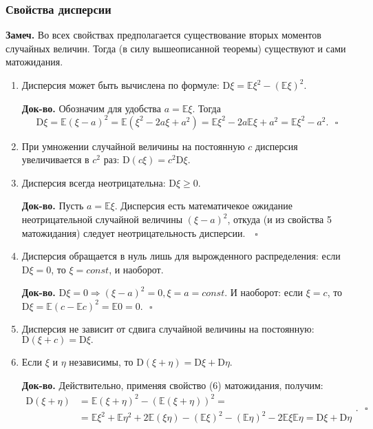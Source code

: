 \documentclass[oneside,final,14pt]{extreport}
\newcommand\mynote{{\bf Замеч.}}
\newcommand\myqed{{\bf Док-во.}}
\theoremstyle{definition}
\begin{document}
\subsubsection{Свойства дисперсии}

\mynote{} Во всех свойствах предполагается существование вторых моментов случайных величин. Тогда (в силу вышеописанной теоремы) существуют и сами матожидания.

\begin{enumerate}
    \item Дисперсия может быть вычислена по формуле: $\mathrm{D}\xi = \mathbb{E}\xi^2 - (\mathbb{E}\xi)^2$.
    
    \myqed{} Обозначим для удобства $a = \mathbb{E}\xi.$ Тогда
    $$\mathrm{D} \xi=\mathbb{E}(\xi-a)^{2}=\mathbb{E}\left(\xi^{2}-2 a \xi+a^{2}\right)=\mathbb{E} \xi^{2}-2 a \mathbb{E} \xi+a^{2}=\mathbb{E} \xi^{2}-a^{2}. ~~~ \square$$
    
    \item При умножении случайной величины на постоянную $c$ дисперсия увеличивается в $c^2$ раз: $\mathrm{D}(c\xi) = c^2\mathrm{D}\xi.$
    \item Дисперсия всегда неотрицательна: $\mathrm{D}\xi \geq 0.$
    
    \myqed{} Пусть $a = \mathbb{E}\xi.$ Дисперсия есть математичекое ожидание неотрицательной случайной величины $(\xi - a)^2$, откуда (и из свойства 5 матожидания) следует неотрицательность дисперсии. $ ~~~ \square$
    
    \item Дисперсия обращается в нуль лишь для вырожденного распределения: если $\mathrm{D}\xi = 0$, то $\xi = const$, и наоборот.
    
    \myqed{} $\mathrm{D}\xi = 0 \Rightarrow (\xi - a)^2 = 0, \xi = a = const.$ И наоборот: если $\xi = c$, то $\mathrm{D} \xi=\mathbb{E}(c-\mathbb{E} c)^{2}=\mathbb{E} 0=0. ~~~ \square$
    
    \item Дисперсия не зависит от сдвига случайной величины на постоянную: $\mathrm{D}(\xi + c) = \mathrm{D}\xi.$
    
    \item Если $\xi$ и $\eta$ независимы, то $\mathrm{D}(\xi + \eta) = \mathrm{D}\xi + \mathrm{D}\eta.$
    
    \myqed{} Действительно, применяя свойство (6) матожидания, получим:
    $$\begin{aligned}
    \mathrm{D}(\xi+\eta) &=\mathbb{E}(\xi+\eta)^{2}-(\mathbb{E}(\xi+\eta))^{2}=\\
    &=\mathbb{E} \xi^{2}+\mathbb{E} \eta^{2}+2 \mathbb{E}(\xi \eta)-(\mathbb{E} \xi)^{2}-(\mathbb{E} \eta)^{2}-2 \mathbb{E} \xi \mathbb{E} \eta=\mathrm{D} \xi+\mathrm{D} \eta
    \end{aligned}. ~~~ \square$$
    

\end{enumerate}
\end{document}
